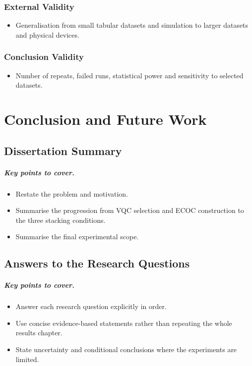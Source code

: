 \documentclass[]{UCD_CS_MSc_AAI_Report}
\newcommand{\sectionbrief}{\paragraph{Key points to cover.}}
\begin{document}
\subsection{External Validity}
\begin{itemize}
    \item Generalisation from small tabular datasets and simulation to larger datasets and physical devices.
\end{itemize}

\subsection{Conclusion Validity}
\begin{itemize}
    \item Number of repeats, failed runs, statistical power and sensitivity to selected datasets.
\end{itemize}

\chapter{Conclusion and Future Work}
\label{chap:conclusion}

\section{Dissertation Summary}
\label{sec:conclusion-summary}

\sectionbrief
\begin{itemize}
    \item Restate the problem and motivation.
    \item Summarise the progression from VQC selection and ECOC construction to the three stacking conditions.
    \item Summarise the final experimental scope.
\end{itemize}

\section{Answers to the Research Questions}
\label{sec:conclusion-rqs}

\sectionbrief
\begin{itemize}
    \item Answer each research question explicitly in order.
    \item Use concise evidence-based statements rather than repeating the whole results chapter.
    \item State uncertainty and conditional conclusions where the experiments are limited.
\end{itemize}
\end{document}
